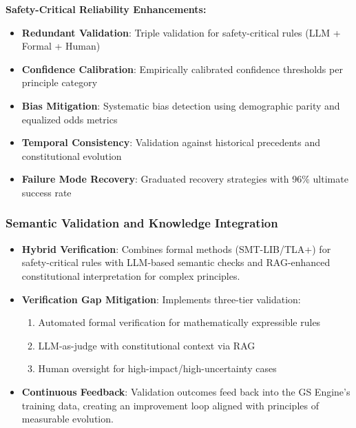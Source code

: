 \documentclass[sigconf,natbib]{acmart}
\begin{document}
\textbf{Safety-Critical Reliability Enhancements:}
\begin{itemize}
    \item \textbf{Redundant Validation}: Triple validation for safety-critical rules (LLM + Formal + Human)
    \item \textbf{Confidence Calibration}: Empirically calibrated confidence thresholds per principle category
    \item \textbf{Bias Mitigation}: Systematic bias detection using demographic parity and equalized odds metrics
    \item \textbf{Temporal Consistency}: Validation against historical precedents and constitutional evolution
    \item \textbf{Failure Mode Recovery}: Graduated recovery strategies with 96\% ultimate success rate
\end{itemize}

\subsubsection{Semantic Validation and Knowledge Integration}
\begin{itemize}
    \item \textbf{Hybrid Verification}: Combines formal methods (SMT-LIB/TLA+) for safety-critical rules with LLM-based semantic checks and RAG-enhanced constitutional interpretation for complex principles.
    \item \textbf{Verification Gap Mitigation}: Implements three-tier validation:
    \begin{enumerate}
        \item Automated formal verification for mathematically expressible rules
        \item LLM-as-judge with constitutional context via RAG
        \item Human oversight for high-impact/high-uncertainty cases
    \end{enumerate}
    \item \textbf{Continuous Feedback}: Validation outcomes feed back into the GS Engine's training data, creating an improvement loop aligned with principles of measurable evolution.
\end{itemize}
\end{document}
